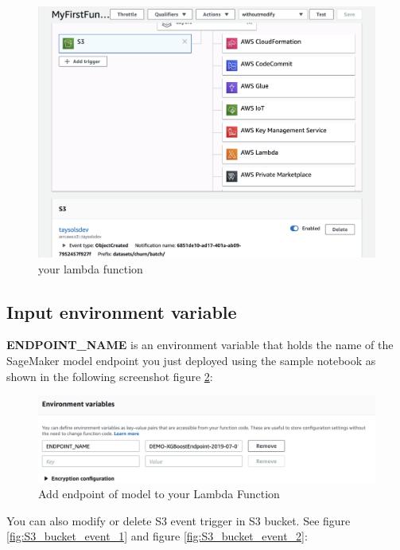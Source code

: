 \documentclass[12pt]{article}
\begin{document}
\begin{figure}[H]
\centering
\begin{minipage}{1\textwidth}
  \centering
  \includegraphics[width=1\linewidth]{build_lambda_2.png}
   \caption{your lambda function}
   \label{fig:build_lambda_2}
\end{minipage}%
\end{figure}


\subsection{Input environment variable}
\textbf{ENDPOINT\_NAME} is an environment variable that holds the name of the SageMaker model endpoint you just deployed using the sample notebook as shown in the following screenshot figure \ref{fig:envir_vari}:

\begin{figure}[H]
\centering
\begin{minipage}{1\textwidth}
  \centering
  \includegraphics[width=1\linewidth]{envir_vari.png}
   \caption{Add endpoint of model to your Lambda Function}
   \label{fig:envir_vari}
\end{minipage}%
\end{figure}
\noindent
You can also modify or delete S3 event trigger in S3 bucket. See figure \ref{fig:S3_bucket_event_1} and figure \ref{fig:S3_bucket_event_2}:
\end{document}
